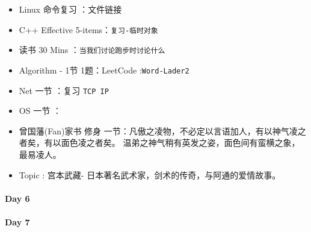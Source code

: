\documentclass[UTF8,a4paper,8pt]{ctexart}
\begin{document}
	 	 \begin{itemize}[itemindent = 1em]
	 	 	\renewcommand\labelitemi{\makebox[0pt][l]{$\square$}\hspace{1em}} 
	 	 	\renewcommand\labelitemi{\makebox[0pt][l]{$\square$}\raisebox{.15ex}{\hspace{0.1em}$\checkmark$}}	 	
	 	 	\item   Linux 命令复习 ：文件链接
	 	 	\item   C++ Effective 5-items：\verb|复习-临时对象|
	 	 	
	 	 	\item   读书  30 Mins	：\verb|当我们讨论跑步时讨论什么|
	 	 	\item   Algorithm - 1节 1题：LeetCode :\verb|Word-Lader2|	
	 	 	\item   Net 一节 ：复习 \verb|TCP IP|	
	 	 	\renewcommand\labelitemi{\makebox[0pt][l]{$\square$}\hspace{1em}} 

	 	 	\item   OS  一节 ：
	 	 	
	 	 	\renewcommand\labelitemi{\makebox[0pt][l]{$\square$}\raisebox{.15ex}{\hspace{0.1em}$\checkmark$}}
	 	 	\item   曾国藩(Fan)家书 修身 一节：凡傲之凌物，不必定以言语加人，有以神气凌之者矣，有以面色凌之者矣。 温弟之神气稍有英发之姿，面色间有蛮横之象，最易凌人。
	 	 	\item   Topic : 宫本武藏- 日本著名武术家，剑术的传奇，与阿通的爱情故事。
	 	 \end{itemize}
 	 \paragraph{Day 6       \quad     }
 	 \paragraph{Day 7       \quad     }
		 	
\end{document}
